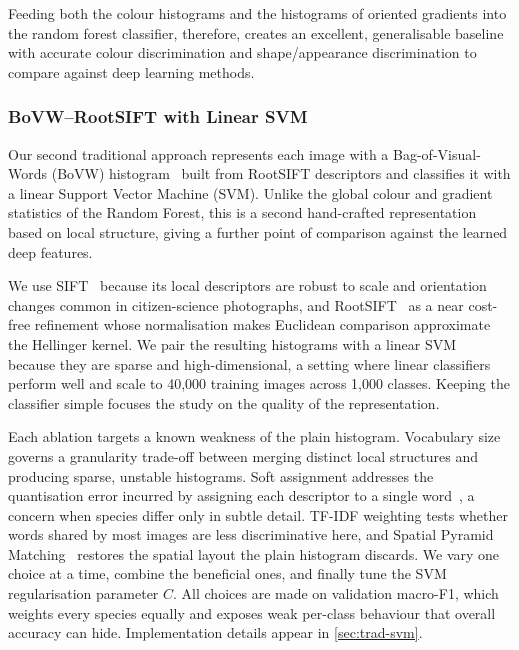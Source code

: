 Feeding both the colour histograms and the histograms of oriented gradients into the random forest classifier, therefore, creates an excellent, generalisable baseline with accurate colour discrimination and shape/appearance discrimination to compare against deep learning methods.

\subsubsection{BoVW--RootSIFT with Linear SVM}
\label{sec:method-svm}
Our second traditional approach represents each image with a Bag-of-Visual-Words (BoVW) histogram~\cite{csurka2004visual} built from RootSIFT descriptors and classifies it with a linear Support Vector Machine (SVM). Unlike the global colour and gradient statistics of the Random Forest, this is a second hand-crafted representation based on local structure, giving a further point of comparison against the learned deep features.
 
We use SIFT~\cite{lowe2004distinctive} because its local descriptors are robust to scale and orientation changes common in citizen-science photographs, and RootSIFT~\cite{arandjelovic2012three} as a near cost-free refinement whose normalisation makes Euclidean comparison approximate the Hellinger kernel. We pair the resulting histograms with a linear SVM~\cite{cortes1995support} because they are sparse and high-dimensional, a setting where linear classifiers perform well and scale to 40{,}000 training images across 1,000 classes. Keeping the classifier simple focuses the study on the quality of the representation.
 
Each ablation targets a known weakness of the plain histogram. Vocabulary size governs a granularity trade-off between merging distinct local structures and producing sparse, unstable histograms. Soft assignment addresses the quantisation error incurred by assigning each descriptor to a single word~\cite{vangemert2010visual}, a concern when species differ only in subtle detail. TF-IDF weighting tests whether words shared by most images are less discriminative here, and Spatial Pyramid Matching~\cite{lazebnik2006beyond} restores the spatial layout the plain histogram discards. We vary one choice at a time, combine the beneficial ones, and finally tune the SVM regularisation parameter $C$. All choices are made on validation macro-F1, which weights every species equally and exposes weak per-class behaviour that overall accuracy can hide. Implementation details appear in \cref{sec:trad-svm}.

